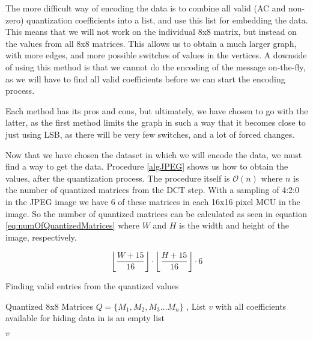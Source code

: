 The more difficult way of encoding the data is to combine all valid (AC and non-zero) quantization coefficients into a list, and use this list for embedding the data. 
This means that we will not work on the individual 8x8 matrix, but instead on the values from all 8x8 matrices. 
This allows us to obtain a much larger graph, with more edges, and more possible switches of values in the vertices. 
A downside of using this method is that we cannot do the encoding of the message on-the-fly, as we will have to find all valid coefficients before we can start the encoding process.

Each method has its pros and cons, but ultimately, we have chosen to go with the latter, as the first method limits the graph in such a way that it becomes close to just using LSB, as there will be very few switches, and a lot of forced changes.

Now that we have chosen the dataset in which we will encode the data, we must find a way to get the data. 
Procedure \ref{algJPEG} shows us how to obtain the values, after the quantization process. 
The procedure itself is $\mathcal{O}(n)$ where $n$ is the number of quantized matrices from the DCT step. 
With a sampling of 4:2:0 in the JPEG image we have 6 of these matrices in each 16x16 pixel MCU in the image. 
So the number of quantized matrices can be calculated as seen in equation \ref{eq:numOfQuantizedMatrices} where $W$ and $H$ is the width and height of the image, respectively.

\begin{equation}
\label{eq:numOfQuantizedMatrices}
\left \lfloor \frac{W + 15}{16}\right \rfloor \cdot \left \lfloor \frac{H + 15}{16}\right \rfloor \cdot 6
\end{equation}

\begin{algorithm}
\caption{Finding valid entries from the quantized values}
\label{algJPEG}
\begin{algorithmic}
\REQUIRE Quantized 8x8 Matrices $Q = \{ M_1, M_2, M_3 \ldots M_n \}$ ,
\ENSURE List $v$ with all coefficients available for hiding data in
 is an empty list

            \ENDIF
        \ENDFOR
    \ENDFOR
\ENDFOR

\RETURN $v$
\end{algorithmic}
\end{algorithm}

